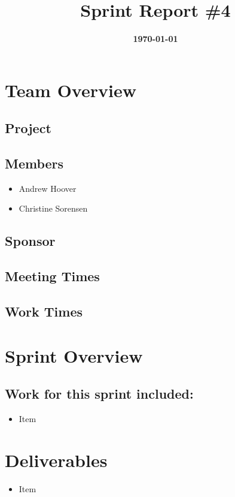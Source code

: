 \documentclass{article}
\title{\normalfont\Large\bfseries\color{TitleColor}Sprint Report \#4}
\date{\normalfont\bfseries\color{TitleColor}\today}
\begin{document}
\maketitle

\section*{Team Overview}
\subsection*{Project}

\subsection*{Members}
\begin{itemize}
	\item Andrew Hoover
	\item Christine Sorensen
\end{itemize}

\subsection*{Sponsor}

\subsection*{Meeting Times}
\subsection*{Work Times}

\section*{Sprint Overview}
\subsection*{Work for this sprint included:}
\begin{itemize}
	\item Item
\end{itemize}

\section*{Deliverables}
\begin{itemize}
	\item Item
\end{itemize}
\end{document}
